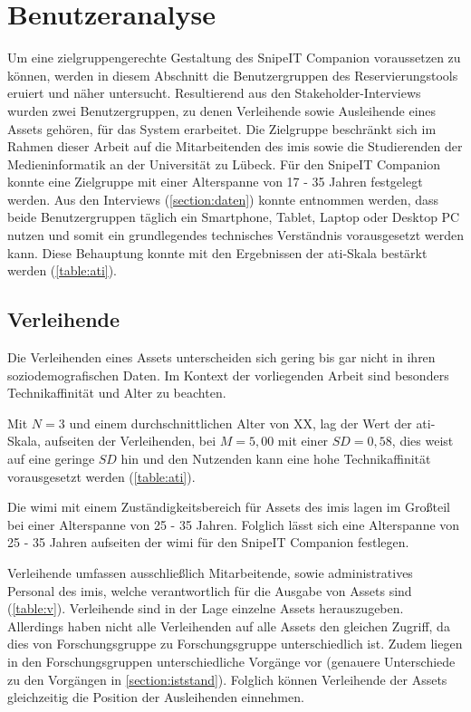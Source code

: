 \section{Benutzeranalyse}
\label{section:benutzer}
Um eine zielgruppengerechte Gestaltung des SnipeIT Companion voraussetzen zu können, werden in
diesem Abschnitt die Benutzergruppen des Reservierungstools eruiert und näher untersucht.
Resultierend aus den Stakeholder-Interviews wurden zwei Benutzergruppen, zu denen Verleihende sowie
Ausleihende eines Assets gehören, für das System erarbeitet. Die Zielgruppe beschränkt sich im
Rahmen dieser Arbeit auf die Mitarbeitenden des \ac{imis} sowie die Studierenden der
Medieninformatik an der Universität zu Lübeck. Für den SnipeIT Companion konnte eine Zielgruppe mit
einer Alterspanne von 17 - 35 Jahren festgelegt werden. Aus den Interviews (\ref{section:daten})
konnte entnommen werden, dass beide Benutzergruppen täglich ein Smartphone, Tablet, Laptop oder
Desktop PC nutzen und somit ein grundlegendes technisches Verständnis vorausgesetzt werden kann.
Diese Behauptung konnte mit den Ergebnissen der \ac{ati}-Skala bestärkt werden (\ref{table:ati}).


\subsection{Verleihende}
Die Verleihenden eines Assets unterscheiden sich gering bis gar nicht in ihren soziodemografischen
Daten. Im Kontext der vorliegenden Arbeit sind besonders Technikaffinität und Alter zu beachten.

Mit $N=3$ und einem durchschnittlichen Alter von XX, lag der Wert der \ac{ati}-Skala, aufseiten der
Verleihenden, bei $M=5,00$ mit einer $SD=0,58$, dies weist auf eine geringe $SD$ hin und den
Nutzenden kann eine hohe Technikaffinität vorausgesetzt werden  (\ref{table:ati}).

Die \ac{wimi} mit einem Zuständigkeitsbereich für Assets des \ac{imis} lagen im Großteil bei einer
Alterspanne von 25 - 35 Jahren. Folglich lässt sich eine Alterspanne von 25 - 35 Jahren aufseiten
der \ac{wimi} für den SnipeIT Companion festlegen.

Verleihende umfassen ausschließlich Mitarbeitende, sowie administratives Personal des \ac{imis},
welche verantwortlich für die Ausgabe von Assets sind (\ref{table:v}). Verleihende sind in der Lage
einzelne Assets herauszugeben. Allerdings haben nicht alle Verleihenden auf alle Assets den gleichen
Zugriff, da dies von Forschungsgruppe zu Forschungsgruppe unterschiedlich ist. Zudem liegen in den
Forschungsgruppen unterschiedliche Vorgänge vor (genauere Unterschiede zu den Vorgängen in
\ref{section:iststand}). Folglich können Verleihende der Assets gleichzeitig die Position der
Ausleihenden einnehmen.

